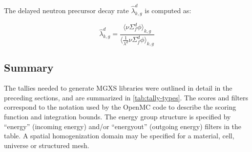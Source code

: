 The delayed neutron precursor decay rate $\hat{\lambda}_{k,g}^{d}$ is computed as:

\begin{equation}
\label{eqn:lambda}
\hat{\lambda}_{k,g}^{d} = \frac{\langle \nu \Sigma_f^d \phi \rangle_{k,g}}{\Big\langle \frac{1}{\lambda^{d}} \nu \Sigma_f^d \phi \Big\rangle_{k,g}}
\end{equation}

\subsection{Summary}
\label{subsec:tally-types-summary}

The tallies needed to generate MGXS libraries were outlined in detail in the preceding sections, and are summarized in \cref{tab:tally-types}. The scores and filters correspond to the notation used by the OpenMC code to describe the scoring function and integration bounds. The energy group structure is specified by ``energy'' (incoming energy) and/or ``energyout'' (outgoing energy) filters in the table. A spatial homogenization domain may be specified for a material, cell, universe or structured mesh.

